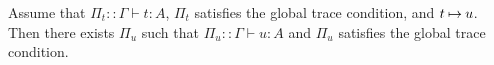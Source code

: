 \begin{theorem}
\label{theorem-subject-reduction}
  Assume that $\Pi_t::\Gamma\vdash t:A$, $\Pi_t$ satisfies the global trace condition, and $t\mathbin{\mapsto} u$.
  Then there exists $\Pi_u$ such that $\Pi_u::\Gamma\vdash u:A$ and $\Pi_u$ satisfies the global trace condition. 
\end{theorem}


